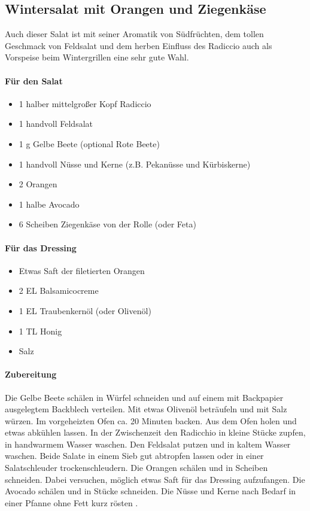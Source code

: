 \subsection{Wintersalat mit Orangen und Ziegenkäse}
Auch dieser Salat ist mit seiner Aromatik von Südfrüchten, dem tollen Geschmack von Feldsalat und dem herben Einfluss des Radiccio
auch als Vorspeise beim Wintergrillen eine sehr gute Wahl.

\paragraph{Für den Salat}

\begin{itemize}[noitemsep]
	\item 1 halber mittelgroßer Kopf Radiccio
	\item 1 handvoll Feldsalat
	\item 1 g Gelbe Beete (optional Rote Beete)
	\item 1 handvoll Nüsse und Kerne (z.B. Pekanüsse und Kürbiskerne)
	\item 2 Orangen
	\item 1 halbe Avocado
	\item 6 Scheiben Ziegenkäse von der Rolle (oder Feta)
\end{itemize}	

\paragraph{Für das Dressing}

\begin{itemize}[noitemsep]
	\item Etwas Saft der filetierten Orangen
	\item 2 EL Balsamicocreme
	\item 1 EL Traubenkernöl (oder Olivenöl)
	\item 1 TL Honig
	\item  Salz
\end{itemize}

\paragraph{Zubereitung}

Die Gelbe Beete schälen in Würfel schneiden und auf einem mit Backpapier 
ausgelegtem Backblech verteilen. Mit etwas Olivenöl beträufeln und 
mit Salz würzen. Im vorgeheizten Ofen ca. 20 Minuten backen. Aus dem Ofen 
holen und etwas abkühlen lassen. In der Zwischenzeit den Radicchio
in kleine Stücke zupfen, in handwarmem Wasser waschen. Den Feldsalat 
putzen und in kaltem Wasser waschen. Beide Salate in einem Sieb gut
abtropfen lassen oder in einer Salatschleuder trockenschleudern. Die Orangen 
schälen und in Scheiben schneiden. Dabei versuchen, möglich etwas
Saft für das Dressing aufzufangen. Die Avocado schälen und in Stücke 
schneiden. Die Nüsse und Kerne nach Bedarf in einer Pfanne ohne Fett kurz 
rösten .

